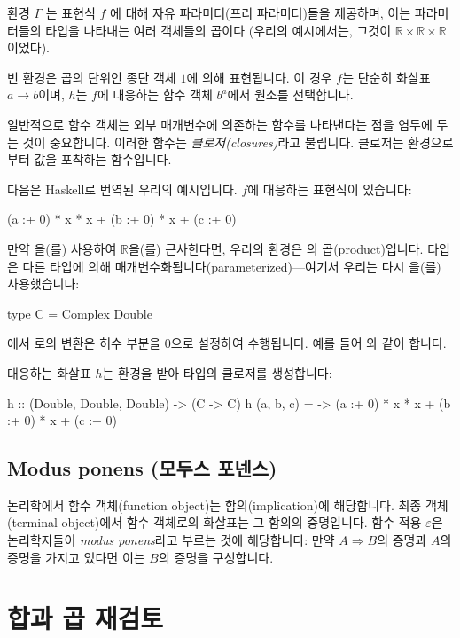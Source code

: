 \documentclass[DaoFP]{subfiles}
\begin{document}
환경 $\Gamma$ 는 표현식 $f$ 에 대해 자유 파라미터(프리 파라미터)들을 제공하며, 이는 파라미터들의 타입을 나타내는 여러 객체들의 곱이다 (우리의 예시에서는, 그것이 $\mathbb{R} \times \mathbb{R} \times \mathbb{R}$ 이었다).

빈 환경은 곱의 단위인 종단 객체 $1$에 의해 표현됩니다. 이 경우 $f$는 단순히 화살표 $a \to b$이며, $h$는 $f$에 대응하는 함수 객체 $b^a$에서 원소를 선택합니다.

일반적으로 함수 객체는 외부 매개변수에 의존하는 함수를 나타낸다는 점을 염두에 두는 것이 중요합니다. 이러한 함수는 \emph{클로저(closures)}라고 불립니다. 클로저는 환경으로부터 값을 포착하는 함수입니다.

다음은 Haskell로 번역된 우리의 예시입니다. $f$에 대응하는 표현식이 있습니다:
\begin{haskell}
(a :+ 0) * x * x + (b :+ 0) * x + (c :+ 0)
\end{haskell}
만약 을(를) 사용하여 $\mathbb{R}$을(를) 근사한다면, 우리의 환경은  의 곱(product)입니다.  타입은 다른 타입에 의해 매개변수화됩니다(parameterized)---여기서 우리는 다시 을(를) 사용했습니다:
\begin{haskell}
type C = Complex Double
\end{haskell}
에서 로의 변환은 허수 부분을 0으로 설정하여 수행됩니다. 예를 들어 와 같이 합니다.

대응하는 화살표 $h$는 환경을 받아  타입의 클로저를 생성합니다:
\begin{haskell}
h :: (Double, Double, Double) -> (C -> C)
h (a, b, c) = \x -> (a :+ 0) * x * x + (b :+ 0) * x + (c :+ 0)
\end{haskell}

\subsection{Modus ponens (모두스 포넨스)}

논리학에서 함수 객체(function object)는 함의(implication)에 해당합니다. 최종 객체(terminal object)에서 함수 객체로의 화살표는 그 함의의 증명입니다. 함수 적용 $\varepsilon$은 논리학자들이 \emph{modus ponens}라고 부르는 것에 해당합니다: 만약 $A \Rightarrow B$의 증명과 $A$의 증명을 가지고 있다면 이는 $B$의 증명을 구성합니다.

\section{합과 곱 재검토}
\end{document}

